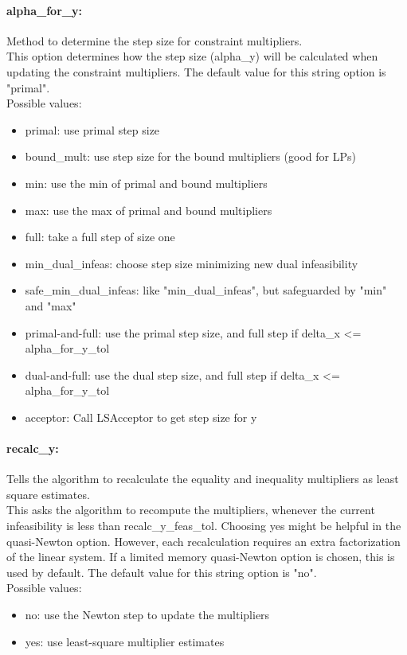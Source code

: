 \paragraph{alpha\_for\_y:}\label{sec:alpha_for_y} Method to determine the step size for constraint multipliers. $\;$ \\
 This option determines how the step size
(alpha\_y) will be calculated when updating the
constraint multipliers.
The default value for this string option is "primal".
\\ 
Possible values:
\begin{itemize}
   \item primal: use primal step size
   \item bound\_mult: use step size for the bound multipliers (good
for LPs)
   \item min: use the min of primal and bound multipliers
   \item max: use the max of primal and bound multipliers
   \item full: take a full step of size one
   \item min\_dual\_infeas: choose step size minimizing new dual
infeasibility
   \item safe\_min\_dual\_infeas: like "min\_dual\_infeas", but safeguarded by
"min" and "max"
   \item primal-and-full: use the primal step size, and full step if
delta\_x <= alpha\_for\_y\_tol
   \item dual-and-full: use the dual step size, and full step if
delta\_x <= alpha\_for\_y\_tol
   \item acceptor: Call LSAcceptor to get step size for y
\end{itemize}

\paragraph{recalc\_y:}\label{sec:recalc_y} Tells the algorithm to recalculate the equality and inequality multipliers as least square estimates. $\;$ \\
 This asks the algorithm to recompute the
multipliers, whenever the current infeasibility
is less than recalc\_y\_feas\_tol. Choosing yes
might be helpful in the quasi-Newton option. 
However, each recalculation requires an extra
factorization of the linear system.  If a limited
memory quasi-Newton option is chosen, this is
used by default.
The default value for this string option is "no".
\\ 
Possible values:
\begin{itemize}
   \item no: use the Newton step to update the multipliers
   \item yes: use least-square multiplier estimates
\end{itemize}

